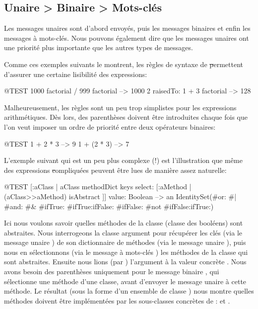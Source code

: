 \documentclass[a4paper,10pt,twoside]{book}
\begin{document}
\subsection*{Unaire > Binaire > Mots-clés}
Les messages unaires sont d'abord envoyés, puis les messages
binaires et enfin les messages à mots-clés. Nous pouvons
également dire que les messages unaires ont une priorité plus
importante que les autres types de messages.


Comme ces exemples suivants le montrent, les règles de syntaxe de
\st permettent d'assurer une certaine lisibilité des expressions:
\begin{code}{@TEST}
1000 factorial / 999 factorial --> 1000
2 raisedTo: 1 + 3 factorial     --> 128
\end{code}
\noindent

Malheureusement, les règles sont un peu trop simplistes pour les
expressions arithmétiques. Dès lors, des parenthèses doivent
être introduites chaque fois que l'on veut imposer un ordre de
priorité entre deux opérateurs binaires:
\begin{code}{@TEST}
1 + 2 * 3   --> 9
1 + (2 * 3) --> 7
\end{code}

L'exemple suivant qui est un peu plus complexe (!) est l'illustration que même des expressions \st compliquées peuvent être lues de manière assez naturelle: 
\begin{code}{@TEST}
[:aClass | aClass methodDict keys select: [:aMethod | (aClass>>aMethod) isAbstract ]] value: Boolean --> an IdentitySet(#or: #| #and: #& #ifTrue: #ifTrue:ifFalse: #ifFalse: #not #ifFalse:ifTrue:)
\end{code}
\noindent
Ici nous voulons savoir quelles méthodes de la classe 
(classe des booléens) sont abstraites.
Nous interrogeons la classe argument  pour récupérer
les clés (via le message unaire ) de son dictionnaire de
méthodes (via le message unaire ), puis nous en
sélectionnons (via le message à mots-clés ) les
méthodes de la classe qui sont abstraites.
Ensuite nous lions (par ) l'argument  à la
valeur concrète .
Nous avons besoin des parenthèses uniquement pour le message binaire
\ct{>>}, qui sélectionne une méthode d'une classe, avant d'envoyer
le message unaire \mbox{} à cette méthode. Le
résultat (sous la forme d'un ensemble de classe )
nous montre quelles méthodes doivent être implémentées par les
sous-classes concrètes de :  et .
\end{document}
